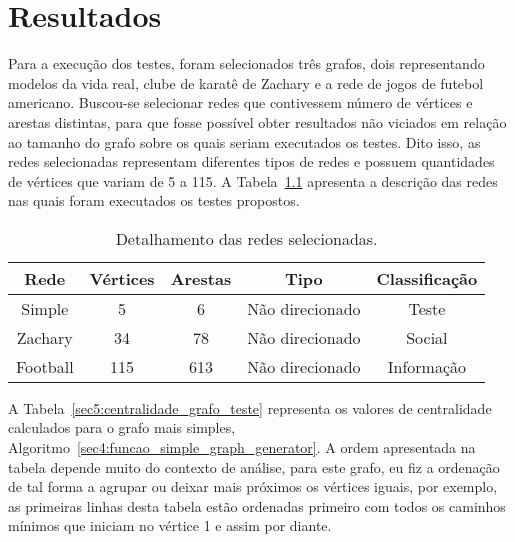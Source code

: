 \graphicspath{{\currfiledir/images/}}

\chapter{Resultados}


Para a execução dos testes, foram selecionados três grafos, dois representando modelos da vida real, clube de karatê de Zachary e a rede de jogos de futebol americano. Buscou-se selecionar redes que contivessem número de vértices e arestas distintas, para que fosse possível obter resultados não viciados em relação ao tamanho do grafo sobre os quais seriam executados os testes. Dito isso, as redes selecionadas representam diferentes tipos de redes e possuem quantidades de vértices que variam de 5 a 115. A Tabela~\ref{sec5:tab_grafos_teste} apresenta a descrição das redes nas quais foram executados os testes propostos.

\begin{table}[!htp]
	\centering
	\caption{Detalhamento das redes selecionadas.}
	\label{sec5:tab_grafos_teste}
	\begin{tabular}{|c|c|c|c|c|}
		\hline
		\textbf{Rede} & \textbf{Vértices} & \textbf{Arestas} & \textbf{Tipo}   & \textbf{Classificação} \\ \hline
		Simple        & 5                 & 6                & Não direcionado & Teste                  \\
		Zachary       & 34                & 78               & Não direcionado & Social                 \\
		Football      & 115               & 613              & Não direcionado & Informação             \\ \hline
	\end{tabular}
\end{table}

A Tabela~\ref{sec5:centralidade_grafo_teste} representa os valores de centralidade calculados para o grafo mais simples, Algoritmo~\ref{sec4:funcao_simple_graph_generator}. A ordem apresentada na tabela depende muito do contexto de análise, para este grafo, eu fiz a ordenação de tal forma a agrupar ou deixar mais próximos os vértices iguais, por exemplo, as primeiras linhas desta tabela estão ordenadas primeiro com todos os caminhos mínimos que iniciam no vértice 1 e assim por diante.

